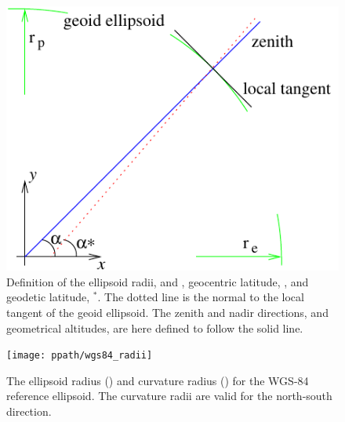 \begin{figure}[!p]
 \begin{center}
  \begin{minipage}[c]{0.65\textwidth}
   \begin{center}
    \includegraphics*[width=0.9\hsize]{Figs/ppath/latitudes}
   \end{center}
  \end{minipage}%
  \begin{minipage}[c]{0.35\textwidth}
   \caption{Definition of the ellipsoid radii,  and , 
     geocentric latitude, \Lat, and geodetic latitude, \Lat$^*$. The
     dotted line is the normal to the local tangent of the geoid
     ellipsoid. The zenith and nadir directions, and geometrical
     altitudes, are here defined to follow the solid line.}
   \label{fig:ppath:lats}
  \end{minipage}
 \end{center}
\end{figure}   

\begin{figure}[!p]
 \begin{minipage}[c]{0.65\textwidth}
 \texttt{[image: ppath/wgs84\_radii]}
 \end{minipage}%
 \begin{minipage}[c]{0.35\textwidth}
  \caption{The ellipsoid radius (\aRds{\odot}) and curvature radius ()
    for the
    WGS-84 reference ellipsoid. The curvature radii are valid for the
    north-south direction.}
  \label{fig:ppath:wgs84radii}
 \end{minipage}%
\end{figure}   
        
